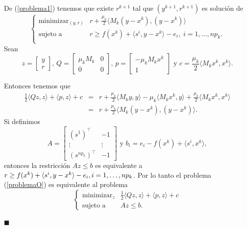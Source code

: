 \documentclass[a4paper,12pt]{report}
\newcommand{\la}{\langle}
\newcommand{\ra}{\rangle}
\newenvironment{dem}{\vspace*{-0.1cm}{\it Demostraci\'on:}}{\hfill
$\blacksquare$\\}
\begin{document}
\begin{dem}
De (\ref{problema1}) tenemos que existe $r^{k+1}$ tal que $(y^{k+1},r^{k+1})$ es soluci\'on de
\begin{equation}\label{problemaO}
\left\{
 \begin{array}{rl}
  \displaystyle{\mathop{\mathrm{minimizar}}_{(y,r)}}& \displaystyle{r+\frac{\mu_k}{2}\la M_k (y-x^k),(y-x^k)\ra}\\
  \mbox{sujeto a}& r\geq f(x^k)+\la s^i,y-x^k\ra-e_i,\;i=1,\ldots,np_k.\\
\end{array}
\right.
\end{equation}
Sean 
\begin{equation}\label{aux1_problemaP}
 z= \left[\begin{array}{c} y\\r\end{array}\right],\,
Q = \left[\begin{array}{cc} \mu_k M_k & 0\\ 0 & 0 \end{array}\right],\,
p= \left[\begin{array}{c} -\mu_k M_kx^k\\ 1\end{array}\right] 
\mbox{ y }c=\frac{\mu_k}{2}\la M_k x^k,x^k\ra.
\end{equation}

Entonces tenemos que 
\begin{eqnarray*}
\frac{1}{2}\la Qz,z\ra+\la p,z\ra + c &=& r+\frac{\mu_k}{2}\la M_k y,y\ra-\mu_k\la M_k x^k,y\ra+\frac{\mu_k}{2}\la M_k x^k,x^k\ra \\
&=& r+\frac{\mu_k}{2}\la M_k (y-x^k),(y-x^k)\ra.
\end{eqnarray*}
Si definimos
\begin{equation}\label{aux2_problemaP}
 A = \left[\begin{array}{cc} (s^1)^\top & -1\\ \vdots & \vdots\\ (s^{np_k})^\top & -1 \end{array} \right]
\mbox{ y } b_i=e_i-f(x^k)+\la s^i,x^k\ra,
\end{equation}
entonces la restricci\'on $Az\leq b$ es equivalente a $r\geq f(x^k)+\la s^i,y-x^k\ra-e_i,\linebreak i=1,\ldots,np_k$.
Por lo tanto el problema (\ref{problemaO}) es equivalente al problema
\begin{equation}\label{problemaP}
\left\{
 \begin{array}{rl}
  \displaystyle{\mathop{\mathrm{minimizar}}_{z}} & \frac{1}{2}\la Qz,z\ra+\la p,z\ra +c\\
  \mbox{sujeto a}& Az\leq b.
 \end{array}
\right.
\end{equation}


\end{dem}
\end{document}

